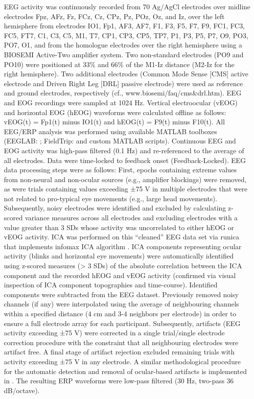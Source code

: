 EEG activity was continuously recorded from 70
Ag/AgCl electrodes over midline electrodes Fpz, AFz, Fz, FCz, Cz, CPz, Pz, POz,
Oz, and Iz, over the left hemisphere from electrodes IO1, Fp1, AF3, AF7, F1,
F3, F5, F7, F9, FC1, FC3, FC5, FT7, C1, C3, C5, M1, T7, CP1, CP3, CP5, TP7, P1,
P3, P5, P7, O9, PO3, PO7, O1, and from the homologue electrodes over the right
hemisphere using a BIOSEMI Active-Two amplifier system. Two non-standard
electrodes (PO9 and PO10) were positioned at 33\% and 66\% of the M1-Iz
distance (M2-Iz for the right hemisphere). Two additional electrodes (Common
Mode Sense [CMS] active electrode and Driven Right Leg [DRL] passive electrode)
were used as reference and ground electrodes, respectively
(cf., www.biosemi/faq/cms\&drl.htm). EEG and EOG recordings were sampled at 1024 Hz.
Vertical electroocular (vEOG) and horizontal EOG (hEOG) waveforms were
calculated offline as follows: vEOG(t) = Fp1(t) minus IO1(t) and hEOG(t) =
F9(t) minus F10(t). All EEG/ERP analysis was performed using available MATLAB
toolboxes (EEGLAB: \textcite{delorme_eeglab_2004}; FieldTrip:
\textcite{oostenveld_fieldtrip_2011} and custom MATLAB scripts). Continuous EEG and EOG
activity was high-pass filtered (0.1 Hz) and re-referenced to the average of
all electrodes. Data were time-locked to feedback onset (Feedback-Locked). EEG
data processing steps were as follows: First, epochs containing extreme values
from non-neural and non-ocular sources (e.g., amplifier blockings) were
removed, as were trials containing values exceeding ±75 \textmu V in multiple
electrodes that were not related to pro-typical eye movements (e.g., large head
movements). Subsequently, noisy electrodes were identified and excluded by
calculating z-scored variance measures across all electrodes and excluding
electrodes with a value greater than 3 SDs whose activity was uncorrelated to
either hEOG or vEOG activity. ICA was performed on this \enquote{cleaned} EEG
data set via runica \parencite[see][]{delorme_eeglab_2004, makeig_blind_1997} that
implements infomax ICA algorithm \parencite[][]{bell_information-maximization_1995}.
ICA components representing ocular activity (blinks and horizontal eye
movements) were automatically identified using z-scored measures (> 3 SDs) of
the absolute correlation between the ICA component and the recorded hEOG and
vEOG activity (confirmed via visual inspection of ICA component topographies
and time-course). Identified components were subtracted from the EEG dataset.
Previously removed noisy channels (if any) were interpolated using the average
of neighbouring channels within a specified distance (4 cm and 3-4 neighbors per
electrode) in order to ensure a full electrode array for each participant.
Subsequently, artifacts (EEG activity exceeding ±75 \textmu V) were corrected in a
single trial/single electrode correction procedure with the constraint that all
neighbouring electrodes were artifact free. A final stage of artifact rejection
excluded remaining trials with activity exceeding ±75 \textmu V in any electrode. A
similar methodological procedure for the automatic detection and removal of
ocular-based artifacts is implemented in \textcite{nolan_faster_2010}. The
resulting ERP waveforms were low-pass filtered (30 Hz, two-pass 36 dB/octave).
